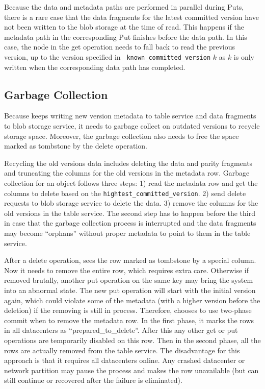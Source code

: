 Because the data and metadata paths are performed in parallel during Puts,
there is a rare case that the data fragments for the latest committed version
have not been written to the blob storage at the time of read. This happens if 
the metadata path in the corresponding Put finishes before the data path. In
this case, the {\name} node in the get operation needs to fall back to read the
previous version, up to the version specified in {\tt
known\_committed\_version} $k$ as $k$ is only written when the corresponding
data path has completed.


\subsection{Garbage Collection}
Because {\name} keeps writing new version metadata to table service and data fragments
to blob storage service, it needs to garbage collect on outdated versions to recycle
storage space. Moreover, the garbage collection also needs to free the space marked as
tombstone by the delete operation.

Recycling the old versions data includes deleting the data and parity fragments and
truncating the columns for the old versions in the metadata row. Garbage collection
for an object follows three steps: 1) read the metadata row and get the columns to
delete based on the \texttt{hightest\_committed\_version}. 2) send delete requests to
blob storage service to delete the data. 3) remove the columns for the old versions
in the table service. The second step has to happen before the third in case that the
garbage collection process is interrupted and the data fragments may become ``orphans''
without proper metadata to point to them in the table service.

After a delete operation, {\name} sees the row marked as tombstone by a special column.
Now it needs to remove the entire row, which requires extra care. Otherwise if removed
brutally, another put operation on the same key may bring the system into an abnormal
state. The new put operation will start with the initial version again, which could
violate some of the metadata (with a higher version before the deletion) if the removing is still in
process. Therefore, {\name} chooses to use two-phase commit when to remove the metadata
row. In the first phase, it marks the rows in all datacenters as ``prepared\_to\_delete''.
After this any other get or put operations are temporarily disabled on this row. Then
in the second phase, all the rows are actually removed from the table service. The
disadvantage for this approach is that it requires all datacenters online. Any crashed
datacenter or network partition may pause the process and makes the row unavailable
(but can still continue or recovered after the failure is eliminated). 



